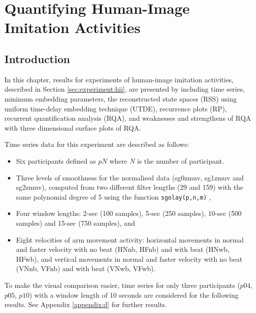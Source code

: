 
\chapter{Quantifying Human-Image Imitation Activities} \label{chapter5}

%

\graphicspath{{figs/chapter5/PDF/}}

\section{Introduction}
In this chapter, results for experiments of human-image imitation 
activities, described in Section \ref{sec:experiment:hii},  
are presented by including time series, minimum embedding parameters, 
the reconstructed state spaces (RSS) using 
uniform time-delay embedding technique (UTDE), 
recurrence plots (RP),
recurrent quantification analysis (RQA), and 
weaknesses and strengthens of RQA with 
three dimensional surface plots of RQA. 

Time series data for this experiment are described as follows:
\begin{itemize}

\item Six participants defined as $pN$ where $N$ is the number of 
	participant.

\item Three levels of smoothness for the normalised data 
(sg0zmuv, sg1zmuv and sg2zmuv), computed from two different filter 
lengths (29 and 159) with the same polynomial degree of 5 using the 
function \texttt{sgolay(p,n,m)} \citep{Rsignal},

\item Four window lengths: 2-sec (100 samples), 5-sec (250 samples), 
	10-sec (500 samples) and 15-sec (750 samples), and 

\item Eight velocities of arm movement activity: 
horizontal movements in normal and faster velocity with no
beat (HNnb, HFnb) and with beat (HNwb, HFwb), 
and 
vertical movements in normal and faster velocity with no
beat (VNnb, VFnb) and with beat (VNwb, VFwb).

\end{itemize}
To make the visual comparison easier, time series for only 
three participants ($p04$, $p05$, $p10$) with a window length 
of 10 seconds are considered for the following results.
See Appendix \ref{appendix:d} for further results.

